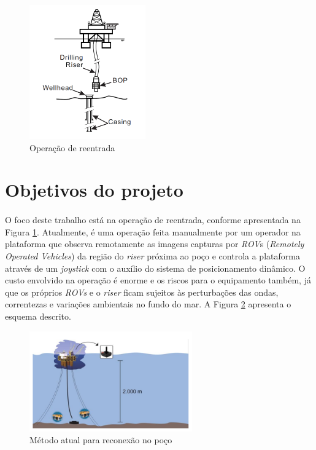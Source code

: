 \begin{figure}[ht!]
\centering
  \includegraphics[width=5cm]{figs/introducao/riser}
  \caption{Operação de reentrada \cite{eugenioASME2012}\label{riser}}
\end{figure}


\section{Objetivos do projeto}

\paragraph{} O foco deste trabalho está na operação de reentrada, conforme apresentada na Figura \ref{riser}. Atualmente, é uma operação feita manualmente por um operador na plataforma que observa remotamente as imagens capturas por \textit{ROV}s (\textit{Remotely Operated Vehicles}) da região do \textit{riser} próxima ao poço e controla a plataforma através de um \textit{joystick} com o auxílio do sistema de posicionamento dinâmico. O custo envolvido na operação é enorme e os riscos para o equipamento também, já que os próprios \textit{ROVs} e o \textit{riser} ficam sujeitos às perturbações das ondas, correntezas e variações ambientais no fundo do mar. A Figura \ref{posicionamentoAtual} apresenta o esquema descrito.

\begin{figure}[ht!]
\centering
  \includegraphics[width=7cm]{figs/introducao/posicionamentoAtual}
  \caption{Método atual para reconexão no poço \cite{redytton} \label{posicionamentoAtual}}
\end{figure}

